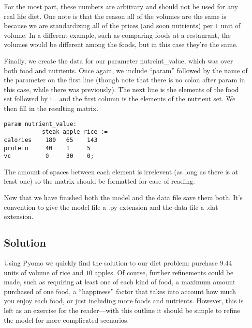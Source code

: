 \documentclass{article}
\begin{document}
For the most part, these numbers are arbitrary and should not be used for any real life diet.  One note is that the reason all of the volumes are the same is because we are standardizing all of the prices (and soon nutrients) per $1$ unit of volume.  In a different example, such as comparing foods at a restaurant, the volumes would be different among the foods, but in this case they're the same.

Finally, we create the data for our parameter nutreint\_value, which was over both food and nutrients.  Once again, we include ``param'' followed by the name of the parameter on the first line (though note that there is no colon after param in this case, while there was previously).  The next line is the elements of the food set followed by := and the first column is the elements of the nutrient set.  We then fill in the resulting matrix.

\begin{verbatim}
param nutrient_value:
           steak apple rice :=
calories    180   65    143
protein     40    1     5
vc          0     30    0;
\end{verbatim}

The amount of spaces between each element is irrelevent (as long as there is at least one) so the matrix should be formatted for ease of reading.

Now that we have finished both the model and the data file save them both. It's convention to give the model file a .py extension and the data file a .dat extension.  

\subsection*{Solution}

Using Pyomo we quickly find the solution to our diet problem: purchase $9.44$ units of volume of rice and $10$ apples. Of course, further refinements could be made, such as requiring at least one of each kind of food, a maximum amount purchased of one food, a ``happiness'' factor that takes into account how much you enjoy each food, or just including more foods and nutrients.  However, this is left as an exercise for the reader---with this outline it should be simple to refine the model for more complicated scenarios.
\end{document}
